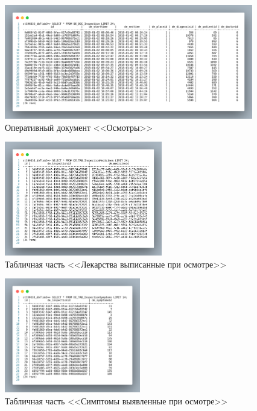 \begin{figure}[p!h]
  \centering

  \includegraphics[height=5cm]
  {inc/DE_DOC_Inspection.png}

  \caption{Оперативный документ <<Осмотры>>}

  \label{fig:DE_DOC_Inspection}
\end{figure}

\begin{figure}[p!h]
  \centering

  \includegraphics[height=5cm]
  {inc/DE_TAB_InspectionMedicines.png}

  \caption{Табличная часть <<Лекарства выписанные при осмотре>>}

  \label{fig:DE_TAB_InspectionMedicines}
\end{figure}

\begin{figure}[p!h]
  \centering

  \includegraphics[height=5cm]
  {inc/DE_TAB_InspectionSymptoms.png}

  \caption{Табличная часть <<Симптомы выявленные при осмотре>>}

  \label{fig:DE_TAB_InspectionSymptoms}
\end{figure}

